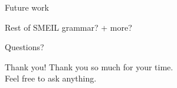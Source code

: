 \documentclass[13pt]{beamer}
\begin{document}
%
\begin{frame}{Future work}
 \begin{block}{Rest of SMEIL grammar?}
     + more?
 \end{block}
\end{frame}
%
\begin{frame}{Questions?}
	\begin{block}{Thank you!}
		Thank you so much for your time. \\
        Feel free to ask anything.
	\end{block}
\end{frame}
\end{document}
